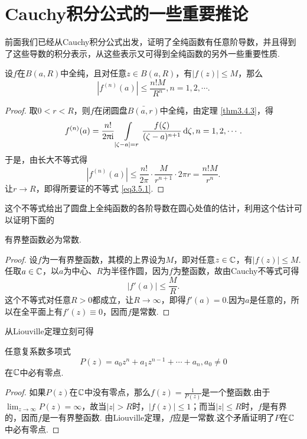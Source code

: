 \section{Cauchy积分公式的一些重要推论\label{sec3.5}}
前面我们已经从Cauchy积分公式出发，证明了全纯函数有任意阶导数，并且得到了这些导数的积分表示，从这些表示又可得到全纯函数的另外一些重要性质.
\begin{theorem}\label{thm3.5.1}
  设$f$在$B(a,R)$中全纯，且对任意$z\in B(a,R)$，有$|f(z)|\le M$，那么
\begin{equation}\label{eq3.5.1}
  |f^{(n)}(a)|\le\frac{n!M}{R^n}, n=1,2,\cdots.
\end{equation}
\end{theorem}
\begin{proof}
  取$0<r<R$，则$f$在闭圆盘$\bar{B(a,r)}$中全纯，由定理 \ref{thm3.4.3}，得
\begin{equation*}
  f^{(n)}(a)=\frac{n!}{2\uppi\mathrm i}\int\limits_{|\zeta-a|=r}\frac{f(\zeta)}{(\zeta-a)^{n+1}}\mathop{}\!\mathrm{d} \zeta,n=1,2,\cdots.
\end{equation*}
于是，由长大不等式得
\[
  |f^{(n)}(a)|\le\frac{n!}{2\pi} \cdot \frac M{r^{n+1}}\cdot2\pi r = \frac{n!M}{r^n}.
\]
让$r\to R$，即得所要证的不等式 \eqref{eq3.5.1}.
\end{proof}


这个不等式给出了圆盘上全纯函数的各阶导数在圆心处值的估计，利用这个估计可以证明下面的
\begin{theorem}\label{thm3.5.2}
  有界整函数必为常数.
\end{theorem}
\begin{proof}
  设$f$为一有界整函数，其模的上界设为$M$，即对任意$z\in\mathbb C$，有$|f(z)|\le M$.任取$a\in\mathbb C$，以$a$为中心、$R$为半径作圆，因为$f$为整函数，故由Cauchy不等式可得
  \[
    |f'(a)| \le \frac MR.
  \]
  这个不等式对任意$R>0$都成立，让$R\to\infty$，即得$f'(a)=0$.因为$a$是任意的，所以在全平面上有$f'(z)\equiv0$，因而$f$是常数.
\end{proof}

从Liouville定理立刻可得
\begin{theorem}\label{thm3.5.3}
  任意复系数多项式
  \[
    P(z) = a_0z^n + a_1z^{n-1} + \cdots + a_n,a_0\ne0
  \]
  在$\mathbb C$中必有零点.
\end{theorem}
\begin{proof}
  如果$P(z)$在$\mathbb C$中没有零点，那么$f(z)=\frac1{P(z)}$是一个整函数.由于$\lim_{z\to\infty}P(z)=\infty$，故当$|z|>R$时，$|f(z)|\le1$；而当$|z|\le R$时，$f$是有界的，因而$f$是一有界整函数. 由Liouville定理，$f$应是一常数.这个矛盾证明了$P$在$\mathbb C$中必有零点.
\end{proof}

